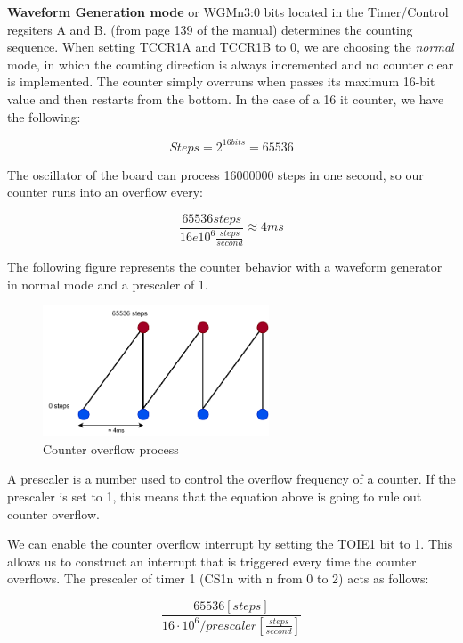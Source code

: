\documentclass[a4paper]{article}
\begin{document}
\textbf{Waveform Generation mode} or WGMn3:0 bits located in the Timer/Control regsiters A and B. (from page 139 of the manual) determines the counting sequence. When setting TCCR1A and TCCR1B to 0, we are choosing the \textit{normal} mode, in which the counting direction is always incremented and no counter clear is implemented.  The counter simply overruns when passes its maximum 16-bit value and then restarts from the bottom. In the case of a 16 it counter, we have the following:

\begin{equation}
	Steps = 2^{16bits} = 65536
\end{equation}

The oscillator of the board can process 16000000 steps in one second, so our counter runs into an overflow every:

\begin{equation}
	\frac{65536 steps}{16e10^{6}\frac{steps}{second}} \approx 4ms
\end{equation}

The following figure represents the counter behavior with a waveform generator in normal mode and a prescaler of 1.

\begin{figure}[h!]
	\centering
	\includegraphics[width=0.6\textwidth]{Counter.pdf}
	\caption{Counter overflow process}
	\label{fig:counter}
\end{figure}

A prescaler is a number used to control the overflow frequency of a  counter. If the prescaler is set to 1, this means that the equation above is going to rule out counter overflow.

We can enable the counter overflow interrupt by setting the TOIE1 bit to 1. This allows us to construct an interrupt that is triggered every time the counter overflows. The prescaler of timer 1 (CS1n with n from 0 to 2) acts as follows:

\begin{equation}
	\frac{65536 [steps]}{16\cdot10^{6}/prescaler[\frac{steps}{second}]}
\end{equation}
\end{document}
